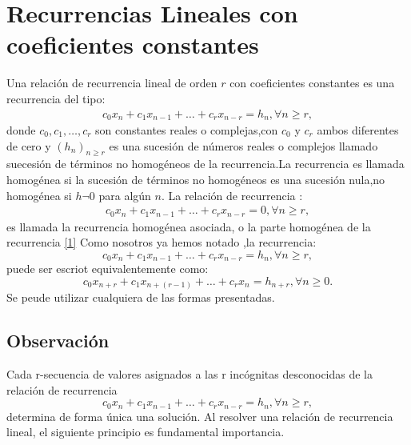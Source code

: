 \documentclass[a4,paper]{article}
\begin{document}
\section{Recurrencias Lineales con coeficientes constantes}
Una relación de recurrencia lineal de orden $ r $ con coeficientes constantes es una recurrencia del tipo:
\begin{align}\label{1}
c_{0}x_{n}+c_{1}x_{n-1}+\ldots+c_{r}x_{n-r}=h_{n}, \forall n \geq r,
\end{align}
donde $ c_{0},c_{1},\ldots,c_{r} $ son constantes reales o complejas,con $ c_{0} $ y $ c_{r} $ ambos diferentes de cero y $ (h_{n})_{n \geq r} $ es una sucesión de números reales o complejos llamado suecesión de términos no 
homogéneos de la recurrencia.La recurrencia es llamada homogénea si la sucesión de términos no homogéneos es una sucesión nula,no homogénea si $ h\neg 0 $ para algún $ n $.
La relación de recurrencia :
\begin{align}\label{2}
c_{0}x_{n}+c_{1}x_{n-1}+\ldots+c_{r}x_{n-r}=0, \forall n \geq r,
\end{align}
es llamada la recurrencia homogénea asociada, o la parte homogénea de la recurrencia \ref{1}
Como nosotros ya hemos notado ,la recurrencia:
$$
c_{0}x_{n}+c_{1}x_{n-1}+\ldots+c_{r}x_{n-r}=h_{n}, \forall n\geq r,
$$
puede ser escriot equivalentemente como:
$$
c_{0}x_{n+r}+c_{1}x_{n+(r-1)}+\ldots+c_{r}x_{n}=h_{n+r}, \forall n\geq 0.
$$
Se peude utilizar cualquiera de las formas presentadas.
\subsection*{Observación}%

Cada r-secuencia de valores asignados a las r incógnitas desconocidas de la
relación de recurrencia 
$$
c_{0}x_{n}+c_{1}x_{n-1}+\ldots+c_{r}x_{n-r}=h_{n}, \forall n\geq r,
$$
determina de forma única una solución.
Al resolver una relación de recurrencia lineal, el siguiente principio es fundamental
importancia.
\end{document}
